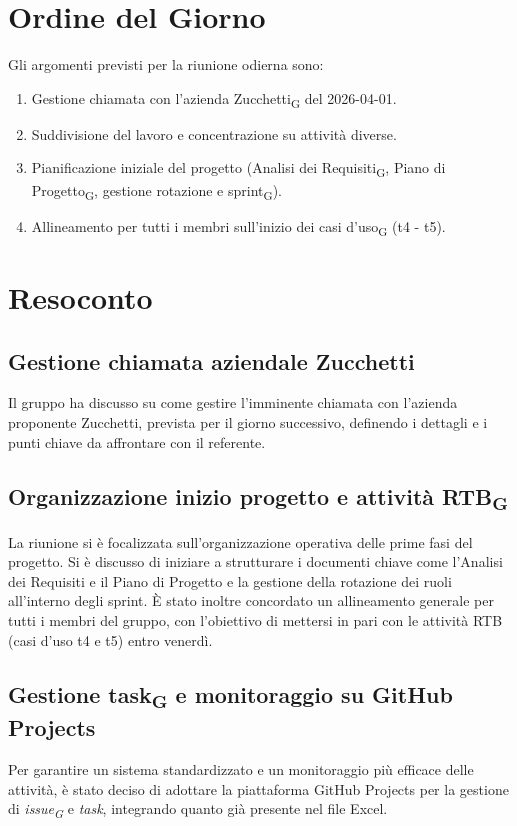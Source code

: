 \section{Ordine del Giorno}
Gli argomenti previsti per la riunione odierna sono:
\begin{enumerate}
	\item Gestione chiamata con l'azienda Zucchetti\textsubscript{G} del 2026-04-01.
	\item Suddivisione del lavoro e concentrazione su attività diverse.
	\item Pianificazione iniziale del progetto (Analisi dei Requisiti\textsubscript{G}, Piano di Progetto\textsubscript{G}, gestione rotazione e sprint\textsubscript{G}).
	\item Allineamento per tutti i membri sull'inizio dei casi d'uso\textsubscript{G} (t4 - t5).
\end{enumerate}

\newpage
\section{Resoconto}

\subsection{Gestione chiamata aziendale Zucchetti}
Il gruppo ha discusso su come gestire l'imminente chiamata con l'azienda proponente Zucchetti, prevista per il giorno successivo, definendo i dettagli e i punti chiave da affrontare con il referente.

\subsection{Organizzazione inizio progetto e attività RTB\textsubscript{G}}
La riunione si è focalizzata sull'organizzazione operativa delle prime fasi del progetto. Si è discusso di iniziare a strutturare i documenti chiave come l'Analisi dei Requisiti e il Piano di Progetto e la gestione della rotazione dei ruoli all'interno degli sprint. È stato inoltre concordato un allineamento generale per tutti i membri del gruppo, con l'obiettivo di mettersi in pari con le attività RTB (casi d'uso t4 e t5) entro venerdì.

\subsection{Gestione task\textsubscript{G} e monitoraggio su GitHub Projects}
Per garantire un sistema standardizzato e un monitoraggio più efficace delle attività, è stato deciso di adottare la piattaforma GitHub Projects per la gestione di \textit{issue\textsubscript{G}} e \textit{task}, integrando quanto già presente nel file Excel.

